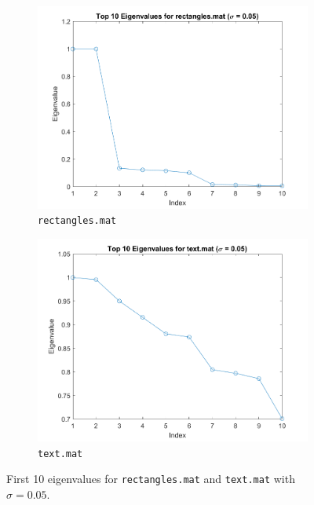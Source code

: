 \documentclass[11pt]{article}
\begin{document}
\begin{figure}[!ht]
    \centering
    \begin{subfigure}{0.45\textwidth}
        \includegraphics[width=\linewidth]{first_10_eigenvalues_rectangles.mat.png}
        \caption{\texttt{rectangles.mat}}
    \end{subfigure}
    \begin{subfigure}{0.45\textwidth}
        \includegraphics[width=\linewidth]{first_10_eigenvalues_text.mat.png}
        \caption{\texttt{text.mat}}
    \end{subfigure}
    \caption{First 10 eigenvalues for \texttt{rectangles.mat} and \texttt{text.mat} with \(\sigma = 0.05\).}
    \label{fig:rectangles}
\end{figure}
\end{document}
